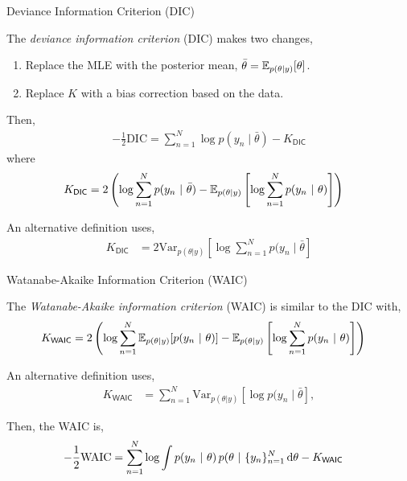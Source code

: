 \documentclass[aspectratio=169]{beamer}
\begin{document}
\begin{frame}{Deviance Information Criterion (DIC)}
    
    The \emph{deviance information criterion} (DIC) makes two changes,
    
    \begin{enumerate}
        \item Replace the MLE with the posterior mean, $\bar{\theta} = \mathbb{E}_{p(\theta | y)}[\theta]$.
        \item Replace $K$ with a bias correction based on the data.
    \end{enumerate}
    Then,
    \begin{align}
        -\frac{1}{2} \mathrm{DIC} = \sum_{n=1}^N \log p(y_n \mid \bar{\theta}) - K_{\mathsf{DIC}}
    \end{align}
    where
    \begin{align}
        K_{\mathsf{DIC}} &= 2 \left( \log \sum_{n=1}^N p(y_n ~\vert~ \bar{\theta}) - \mathbb{E}_{p(\theta | y)} \left[ \log \sum_{n=1}^N p(y_n ~\vert~ \theta) \right] \right)
    \end{align}
    
    An alternative definition uses,
    \begin{align}
        K_{\mathsf{DIC}} &= 2 \mathrm{Var}_{p(\theta | y)} \left[ \log \sum_{n=1}^N p(y_n \mid \bar{\theta} \right] 
    \end{align}
\end{frame}

\begin{frame}{Watanabe-Akaike Information Criterion (WAIC)}
    
    The \emph{Watanabe-Akaike information criterion} (WAIC) is similar to the DIC with,
    \begin{align}
        K_{\mathsf{WAIC}} &= 2 \left( \log \sum_{n=1}^N \mathbb{E}_{p(\theta | y)} [p(y_n ~\vert~ \theta)] - \mathbb{E}_{p(\theta | y)} \left[ \log \sum_{n=1}^N p(y_n ~\vert~ \theta) \right] \right)
    \end{align}
    
    An alternative definition uses,
    \begin{align}
        K_{\mathsf{WAIC}} &= \sum_{n=1}^N \mathrm{Var}_{p(\theta | y)} \left[ \log p(y_n \mid \bar{\theta} \right],
    \end{align}
    
    Then, the WAIC is,
    \begin{align}
        -\frac{1}{2} \mathrm{WAIC} &= \sum_{n=1}^N \log \int p(y_n ~\vert~ \theta) \, p(\theta ~\vert~ \{y_n\}_{n=1}^N \mathop{}\!\mathrm{d} \theta - K_{\mathsf{WAIC}}
    \end{align}
    
\end{frame}
\end{document}
